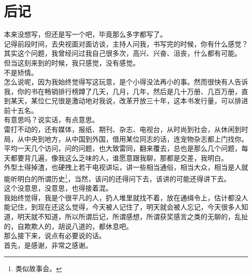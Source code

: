 \chapter*{后记}
\ifnum{}
	\begin{multicols}{\theparacolNo}
\fi
本来没想写，但还是写一个吧，毕竟那么多字都写了。\\

记得前段时间，去央视面对面访谈，主持人问我，书写完的时候，你有什么感觉？\\

其实这个问题，我曾经问过我自己很多次，高兴、兴奋、沮丧，什么都有可能。\\

但当这刻来到的时候，我只感觉，没有感觉。\\

不是矫情。\\

怎么说呢，因为我始终觉得写这玩意，是个小得没法再小的事。然而很快有人告诉我，你的书在畅销排行榜蹲了几天，几月，几年，然后是几十万册、几百万册，直到某天，某位仁兄很是激动地对我说，改革开放三十年，这本书发行量，可以排进前十五名。\\

有意思吗？说实话，有点意思。\\

雷打不动的，还有媒体，报纸、期刊、杂志、电视台，从时尚到社会，从休闲到时局，从中央到地方，从中国到外国，借用某位同志的话，连宠物杂志都上门找你。平均一天几个访问，问的问题，也大致雷同，翻来覆去，总也是那么几个问题，每天都要背几遍，像我这么乏味的人，谁愿意跟我聊，那都是交差，我明白。\\

外型土得掉渣，也硬拽上若干电视讲坛，讲一些相当通俗，相当大众，相当是人就能听明白的所谓历史\footnote{类似故事会。}，当然，该问的还得问下去，该讲的可能还得讲下去。\\

这个没意思，没意思，也得接着混。\\

我始终觉得，我是个很平凡的人，扔人堆里就找不着，放在通缉令上，估计都没人能记住，到现在还这么觉得，今天被人记住了，明天就会被人忘记，今天很多人知道，明天就不知道，所以所谓后记，所谓感想，所谓获奖感言之类的无聊的，乱扯的，自欺欺人的，胡说八道的，都休息吧。\\

那么接下来，说点有必要说的话。\\

首先，是感谢，非常之感谢。\\


\end{multicols}
